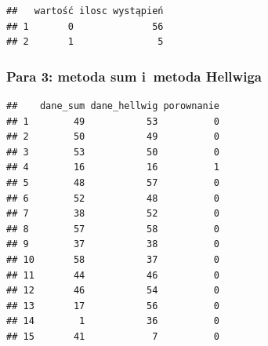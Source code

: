\documentclass[12pt,a4paper]{report}
\begin{document}
{\begin{verbatim}
##   wartość ilosc wystąpień
## 1       0              56
## 2       1               5
\end{verbatim}

\subsubsection{Para 3: metoda sum i~metoda
Hellwiga}%

\begin{Shaded}
\begin{Highlighting}[]
\NormalTok{(}\NormalTok{,}\NormalTok{)}

\NormalTok{:}
\NormalTok{\{}
  \NormalTok{\{}
  \NormalTok{\}}
\NormalTok{\}}
\NormalTok{)}
\end{Highlighting}
\end{Shaded}

\begin{verbatim}
##    dane_sum dane_hellwig porownanie
## 1        49           53          0
## 2        50           49          0
## 3        53           50          0
## 4        16           16          1
## 5        48           57          0
## 6        52           48          0
## 7        38           52          0
## 8        57           58          0
## 9        37           38          0
## 10       58           37          0
## 11       44           46          0
## 12       46           54          0
## 13       17           56          0
## 14        1           36          0
## 15       41            7          0
\end{verbatim}

\begin{Shaded}
\begin{Highlighting}[]
\NormalTok{(}
\NormalTok{(}\NormalTok{,}\NormalTok{)}
\end{Highlighting}
\end{Shaded}

}
\end{document}
